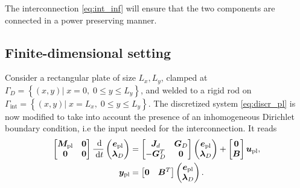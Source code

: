 \documentclass[letterpaper, 10 pt, conference]{ieeeconf}
\begin{document}
The interconnection \eqref{eq:int_inf} will ensure that the two components are connected in a power preserving manner.
\subsection{Finite-dimensional setting}
Consider a rectangular plate of size $L_x, L_y$, clamped at $\Gamma_{D} = \left\{(x,y) \vert \;  x=0, \; 0 \le y \le L_y  \right\}$, and welded to a rigid rod on $\Gamma_{\text{int}} = \left\{ (x,y) \vert \;  x=L_x, \; 0 \le y \le L_y  \right\}$. The discretized system \eqref{eq:discr_pl} is now modified to take into account the presence of an inhomogeneous Dirichlet boundary condition, i.e the input needed for the interconnection. It reads
\begin{equation}
\begin{aligned}
\begin{bmatrix}
\bm{M}_{\text{pl}} & \bm{0} \\
\bm{0} & \bm{0} \\
\end{bmatrix}\frac{\d}{\d t}
\begin{pmatrix}
\bm{e}_{\text{pl}}\\
\bm{\lambda}_D \\
\end{pmatrix}
&= \begin{bmatrix}
\bm{J}_d & \bm{G}_D \\
-\bm{G}_D^T & \bm{0} \\
\end{bmatrix}
\begin{pmatrix}
\bm{e}_{\text{pl}}\\
\bm{\lambda}_D \\
\end{pmatrix} + \begin{bmatrix}
\bm{0} \\
\bm{B} \\
\end{bmatrix} \bm{u}_{\text{pl}}, \\
\bm{y}_{\text{pl}} &= \begin{bmatrix}
\bm{0} & \bm{B}^T \\
\end{bmatrix} \begin{pmatrix}
\bm{e}_{\text{pl}}\\
\bm{\lambda}_D \\
\end{pmatrix}.
\end{aligned} 
\end{equation}
\end{document}
